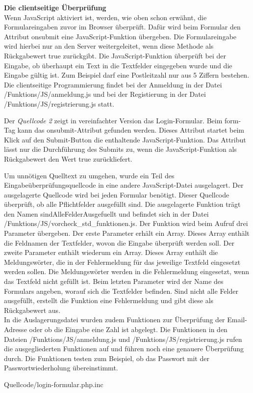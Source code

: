 \textbf{Die clientseitige Überprüfung}\\
Wenn JavaScript aktiviert ist, werden, wie oben schon erwähnt, die Formulareingaben zuvor im Browser überprüft. Dafür wird beim Formular den Attribut \glqq onsubmit\grqq{} eine JavaScript-Funktion übergeben. Die Formulareingabe wird hierbei nur an den Server weitergeleitet, wenn diese Methode als Rückgabewert \glqq true\grqq{} zurückgibt. Die JavaScript-Funktion überprüft bei der Eingabe, ob überhaupt ein Text in die Textfelder eingegeben wurde und die Eingabe gültig ist. Zum Beispiel darf eine Postleitzahl nur aus 5 Ziffern bestehen. Die clientseitige Programmierung findet bei der Anmeldung in der Datei \glqq /Funktions/JS/anmeldung.js\grqq{} und bei der Registierung in der Datei \glqq /Funktions/JS/registrierung.js\grqq{} statt.

Der \textit{Quellcode 2} zeigt in vereinfachter Version das Login-Formular. Beim \glqq form\grqq{}-Tag kann das \glqq onsubmit\grqq{}-Attribut gefunden werden. Dieses Attribut startet beim Klick auf den Submit-Button die enthaltende JavaScript-Funktion. Das Attribut lässt nur die Durchführung des Submits zu, wenn die JavaScript-Funktion als Rückgabewert den Wert \glqq true\grqq{} zurückliefert.

Um unnötigen Quelltext zu umgehen, wurde ein Teil des Eingabeüberprüfungsquellcode in eine andere JavaScript-Datei ausgelagert. Der ausgelagerte Quellcode wird bei jeden Formular benötigt. Dieser Quellcode überprüft, ob alle Pflichtfelder ausgefüllt sind. Die ausgelagerte Funktion trägt den Namen \glqq sindAlleFelderAusgefuellt\grqq{} und befindet sich in der Datei \glqq /Funktions/JS/vorcheck\_std\_funktionen.js\grqq{}. Der Funktion wird beim Aufruf drei Parameter übergeben. Der erste Parameter erhält ein Array. Dieses Array enthält die Feldnamen der Textfelder, wovon die Eingabe überprüft werden soll. Der zweite Parameter enthält wiederum ein Array. Dieses Array enthält die Meldungswörter, die in der Fehlermeldung für das jeweilige Textfeld eingesetzt werden sollen. Die Meldungswörter werden in die Fehlermeldung eingesetzt, wenn das Textfeld nicht gefüllt ist. Beim letzten Parameter wird der Name des Formulars angeben, worauf sich die Textfelder befinden. Sind nicht alle Felder ausgefüllt, erstellt die Funktion eine Fehlermeldung und gibt diese als Rückgabewert aus.\\
In die Auslagerungsdatei wurden zudem Funktionen zur Überprüfung der Email-Adresse oder ob die Eingabe eine Zahl ist abgelegt. Die Funktionen in den Dateien \glqq /Funktions/JS/anmeldung.js\grqq{} und  
\glqq /Funktions/JS/registrierung.js\grqq{} rufen die ausgegliederten Funktionen auf und führen noch eine genauere Überprüfung durch. Die Funktionen testen zum Beispiel, ob das Passwort mit der Passwortwiederholung übereinstimmt.
\newpage
\begin{center}
	\begin{lstinputlisting}[language=HTML, caption={Login-Formular (vereinfacht)}]
		{Quellcode/login-formular.php.inc}
	\end{lstinputlisting}
\end{center}

